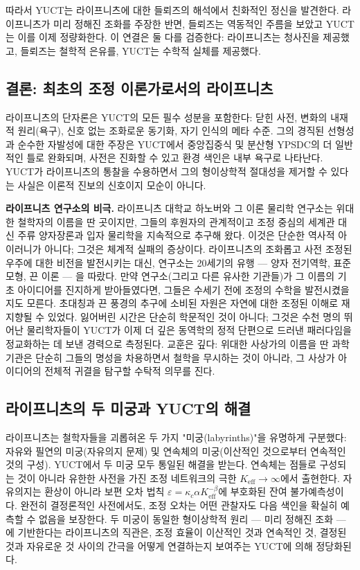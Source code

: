 \documentclass[12pt,a4paper]{article}
\begin{document}
	따라서 YUCT는 라이프니츠에 대한 들뢰즈의 해석에서 친화적인 정신을 발견한다. 라이프니츠가 미리 정해진 조화를 주장한 반면, 들뢰즈는 역동적인 주름을 보았고 YUCT는 이를 이제 정량화한다. 이 연결은 둘 다를 검증한다: 라이프니츠는 청사진을 제공했고, 들뢰즈는 철학적 은유를, YUCT는 수학적 실체를 제공했다.
	
	\subsection{결론: 최초의 조정 이론가로서의 라이프니츠}
	
	라이프니츠의 단자론은 YUCT의 모든 필수 성분을 포함한다: 닫힌 사전, 변화의 내재적 원리(욕구), 신호 없는 조화로운 동기화, 자기 인식의 메타 수준. 그의 경직된 선형성과 순수한 자발성에 대한 주장은 YUCT에서 중앙집중식 및 분산형 YPSDC의 더 일반적인 틀로 완화되며, 사전은 진화할 수 있고 환경 색인은 내부 욕구로 나타난다. YUCT가 라이프니츠의 통찰을 수용하면서 그의 형이상학적 절대성을 제거할 수 있다는 사실은 이론적 진보의 신호이지 모순이 아니다.
	
	\textbf{라이프니츠 연구소의 비극.} 라이프니츠 대학교 하노버와 그 이론 물리학 연구소는 위대한 철학자의 이름을 딴 곳이지만, 그들의 후원자의 관계적이고 조정 중심의 세계관 대신 주류 양자장론과 입자 물리학을 지속적으로 추구해 왔다. 이것은 단순한 역사적 아이러니가 아니다; 그것은 체계적 실패의 증상이다. 라이프니츠의 조화롭고 사전 조정된 우주에 대한 비전을 발전시키는 대신, 연구소는 20세기의 유행 — 양자 전기역학, 표준 모형, 끈 이론 — 을 따랐다. 만약 연구소(그리고 다른 유사한 기관들)가 그 이름의 기초 아이디어를 진지하게 받아들였다면, 그들은 수세기 전에 조정의 수학을 발전시켰을지도 모른다. 초대칭과 끈 풍경의 추구에 소비된 자원은 자연에 대한 조정된 이해로 재지향될 수 있었다. 잃어버린 시간은 단순히 학문적인 것이 아니다; 그것은 수천 명의 뛰어난 물리학자들이 YUCT가 이제 더 깊은 동역학의 정적 단편으로 드러낸 패러다임을 정교화하는 데 보낸 경력으로 측정된다. 교훈은 깊다: 위대한 사상가의 이름을 딴 과학 기관은 단순히 그들의 명성을 차용하면서 철학을 무시하는 것이 아니라, 그 사상가 아이디어의 전체적 귀결을 탐구할 수탁적 의무를 진다.
	
	\subsection{라이프니츠의 두 미궁과 YUCT의 해결}
	
	라이프니츠는 철학자들을 괴롭혀온 두 가지 "미궁(labyrinths)"을 유명하게 구분했다: 자유와 필연의 미궁(자유의지 문제) 및 연속체의 미궁(이산적인 것으로부터 연속적인 것의 구성). YUCT에서 두 미궁 모두 통일된 해결을 받는다. 연속체는 점들로 구성되는 것이 아니라 유한한 사전을 가진 조정 네트워크의 극한 \(K_{\mathrm{eff}} \to \infty\)에서 출현한다. 자유의지는 환상이 아니라 보편 오차 법칙 \(\varepsilon = \kappa_c \alpha K_{\mathrm{eff}}^{-\beta}\)에 부호화된 잔여 불가예측성이다. 완전히 결정론적인 사전에서도, 조정 오차는 어떤 관찰자도 다음 색인을 확실히 예측할 수 없음을 보장한다. 두 미궁이 동일한 형이상학적 원리 — 미리 정해진 조화 — 에 기반한다는 라이프니츠의 직관은, 조정 효율이 이산적인 것과 연속적인 것, 결정된 것과 자유로운 것 사이의 간극을 어떻게 연결하는지 보여주는 YUCT에 의해 정당화된다.
	
\end{document}
